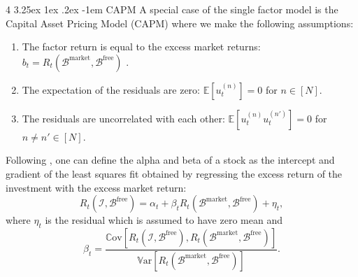 \documentclass[12pt]{article}
\makeatletter
\renewcommand\paragraph{%
	\@startsection{paragraph}
	{4}
	{\z@}
	{3.25ex \@plus1ex \@minus.2ex}
	{-1em}
	{\normalfont\normalsize\bfseries\maybe@addperiod}%
}
\newcommand{\maybe@addperiod}[1]{%
	#1\@addpunct{.}%
}
\makeatother
\begin{document}
\paragraph{CAPM} A special case of the single factor model is the Capital Asset Pricing Model (CAPM) where we make the following assumptions:
\begin{enumerate}
	\item The factor return is equal to the excess market returns: $b_t = R_t(\mathcal{B}^{\text{market}}, \mathcal{B}^{\text{free}})$ .
	\item The expectation of the residuals are zero: $\mathbb{E}[u^{(n)}_t] = 0$ for $n \in [N]$.
	\item The residuals are uncorrelated with each other: $\mathbb{E}[u^{(n)}_t u^{(n')}_t] = 0$ for $n \neq n' \in [N]$.
\end{enumerate}
Following \citet[Chapter 1]{grinold1999}, one can define the alpha and beta of a stock as the intercept and gradient of the least squares fit obtained by regressing the excess return of the investment with the excess market return:
\begin{equation}
	R_t(\mathcal{I}, \mathcal{B}^{\text{free}})
	= \alpha_t + \beta_t R_t(\mathcal{B}^{\text{market}}, \mathcal{B}^{\text{free}}) + \eta_t,
\end{equation}
where $\eta_t$ is the residual which is assumed to have zero mean and 
\begin{equation}
	\beta_t = \frac{\mathbb{C}\text{ov}[R_t(\mathcal{I}, \mathcal{B}^{\text{free}}), R_t(\mathcal{B}^{\text{market}}, \mathcal{B}^{\text{free}})]}{ \mathbb{V}\text{ar}[R_t(\mathcal{B}^{\text{market}}, \mathcal{B}^{\text{free}})]}.
\end{equation} 
\end{document}
